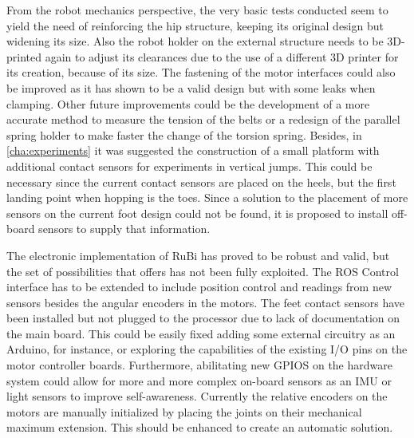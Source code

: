 From the robot mechanics perspective, the very basic tests conducted seem to yield the need of reinforcing the hip structure, keeping its original design but widening its size.
Also the robot holder on the external structure needs to be 3D-printed again to adjust its clearances due to the use of a different 3D printer for its creation, because of its size.
The fastening of the motor interfaces could also be improved as it has shown to be a valid design but with some leaks when clamping.
Other future improvements could be the development of a more accurate method to measure the tension of the belts or a redesign of the parallel spring holder to make faster the change of the torsion spring.
Besides, in \ref{cha:experiments} it was suggested the construction of a small platform with additional contact sensors for experiments in vertical jumps.
This could be necessary since the current contact sensors are placed on the heels, but the first landing point when hopping is the toes.
Since a solution to the placement of more sensors on the current foot design could not be found, it is proposed to install off-board sensors to supply that information.

The electronic implementation of RuBi has proved to be robust and valid, but the set of possibilities that offers has not been fully exploited.
The ROS Control interface has to be extended to include position control and readings from new sensors besides the angular encoders in the motors.
The feet contact sensors have been installed but not plugged to the processor due to lack of documentation on the main board.
This could be easily fixed adding some external circuitry as an Arduino, for instance, or exploring the capabilities of the existing I/O pins on the motor controller boards.
Furthermore, abilitating new GPIOS on the hardware system could allow for more and more complex on-board sensors as an IMU or light sensors to improve self-awareness.
Currently the relative encoders on the motors are manually initialized by placing the joints on their mechanical maximum extension.
This should be enhanced to create an automatic solution.

